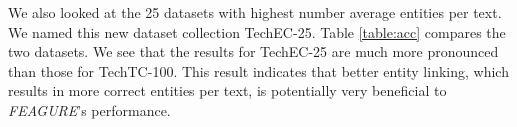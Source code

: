 \documentclass{article}
\theoremstyle{definition}
\begin{document}
		
		
		
		
		


We also looked at the 25 datasets with highest number average entities per text. We named this new dataset collection TechEC-25.%
Table \ref{table:acc} compares the two datasets. We see that the results for TechEC-25 are much more pronounced than those for TechTC-100. This result indicates that better entity linking, which results in more correct entities per text, is potentially very beneficial to \emph{FEAGURE}'s performance.

		
\end{document}
